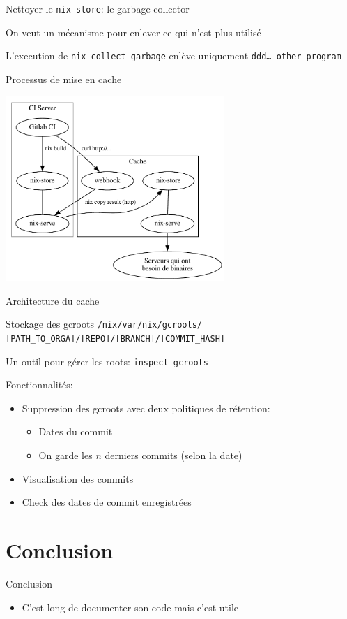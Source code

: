 \documentclass{beamer}
\begin{document}
\begin{frame}{Nettoyer le \texttt{nix-store}: le garbage collector}

On veut un mécanisme pour enlever ce qui n'est plus utilisé

\vspace{0.3cm}


L'execution de \texttt{nix-collect-garbage} enlève uniquement \texttt{ddd\dots-other-program}
\end{frame}

\begin{frame}{Processus de mise en cache}

	\centering
	\includegraphics[height=7cm]{../media/ci.pdf}

Architecture du cache
\end{frame}
\begin{frame}{Stockage des gcroots}
\texttt{/nix/var/nix/gcroots/}\\
\texttt{[PATH\_TO\_ORGA]/[REPO]/[BRANCH]/[COMMIT\_HASH]}

\vspace{0.5cm}

	Un outil pour gérer les roots: \texttt{inspect-gcroots}


	Fonctionnalités:

	\begin{itemize}
	\item Suppression des gcroots avec deux politiques de rétention:
		\begin{itemize}
	\item Dates du commit
	\item On garde les $n$ derniers commits (selon la date)
\end{itemize}
	\item Visualisation des commits
	\item Check des dates de commit enregistrées
\end{itemize}
\end{frame}

\section{Conclusion}

\begin{frame}{Conclusion}
	\begin{itemize}
		\item C'est long de documenter son code mais c'est utile
	\end{itemize}

\end{frame}
\end{document}

